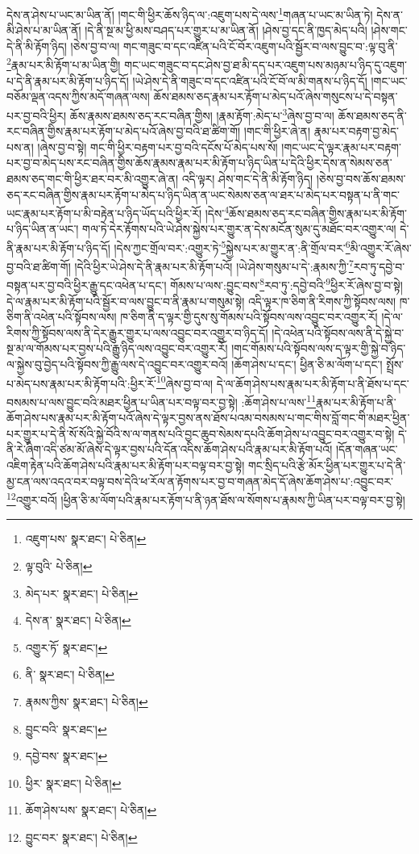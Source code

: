དེས་ན་ཤེས་པ་ཡང་མ་ཡིན་ནོ། །གང་གི་ཕྱིར་ཆོས་ཉིད་ལ་:འཇུག་པས་དེ་ལས་\footnote{འཇུག་པས་  སྣར་ཐང་།  པེ་ཅིན། }གཞན་པ་ཡང་མ་ཡིན་ཏེ། དེས་ན་མི་ཤེས་པ་མ་ཡིན་ནོ། །དེ་ནི་སྔ་མ་ཕྱི་མས་བཤད་པར་གྱུར་པ་མ་ཡིན་ནོ། །ཤེས་བྱ་དང་ནི་ཁྱད་མེད་པའི། །ཤེས་གང་དེ་ནི་མི་རྟོག་ཉིད། །ཅེས་བྱ་བ་ལ། གང་གཟུང་བ་དང་འཛིན་པའི་ངོ་བོར་འཇུག་པའི་སྦྱོར་བ་ལས་བྱུང་བ་:ལྟ་བུ་ནི་\footnote{ལྟ་བུའི་  པེ་ཅིན། }རྣམ་པར་མི་རྟོག་པ་མ་ཡིན་གྱི། གང་ཡང་གཟུང་བ་དང་ཤེས་བྱ་ཐ་མི་དད་པར་འཇུག་པས་མཉམ་པ་ཉིད་དུ་འཇུག་པ་དེ་ནི་རྣམ་པར་མི་རྟོག་པ་ཉིད་དོ། །ཡེ་ཤེས་དེ་ནི་གཟུང་བ་དང་འཛིན་པའི་ངོ་བོ་ལ་མི་གནས་པ་ཉིད་དོ། །གང་ཡང་བཅོམ་ལྡན་འདས་ཀྱིས་མདོ་གཞན་ལས། ཆོས་ཐམས་ཅད་རྣམ་པར་རྟོག་པ་མེད་པའོ་ཞེས་གསུངས་པ་དེ་བསྟན་པར་བྱ་བའི་ཕྱིར། ཆོས་རྣམས་ཐམས་ཅད་རང་བཞིན་གྱིས། །རྣམ་རྟོག་:མེད་པ་\footnote{མེད་པར་  སྣར་ཐང་།  པེ་ཅིན། }ཞེས་བྱ་བ་ལ། ཆོས་ཐམས་ཅད་ནི་རང་བཞིན་གྱིས་རྣམ་པར་རྟོག་པ་མེད་པའོ་ཞེས་བྱ་བའི་ཐ་ཚིག་གོ། །གང་གི་ཕྱིར་ཞེ་ན། རྣམ་པར་བརྟག་བྱ་མེད་པས་ན། །ཞེས་བྱ་བ་སྟེ། གང་གི་ཕྱིར་བརྟག་པར་བྱ་བའི་དངོས་པོ་མེད་པས་སོ། །གང་ཡང་དེ་ལྟར་རྣམ་པར་བརྟག་པར་བྱ་བ་མེད་པས་རང་བཞིན་གྱིས་ཆོས་རྣམས་རྣམ་པར་མི་རྟོག་པ་ཉིད་ཡིན་པ་དེའི་ཕྱིར་དེས་ན་སེམས་ཅན་ཐམས་ཅད་གང་གི་ཕྱིར་ཐར་བར་མི་འགྱུར་ཞེ་ན། འདི་ལྟར། ཤེས་གང་དེ་ནི་མི་རྟོག་ཉིད། །ཅེས་བྱ་བས་ཆོས་ཐམས་ཅད་རང་བཞིན་གྱིས་རྣམ་པར་རྟོག་པ་མེད་པ་ཉིད་ཡིན་ན་ཡང་སེམས་ཅན་ལ་ཐར་པ་མེད་པར་བསྟན་པ་ནི་གང་ཡང་རྣམ་པར་རྟོག་པ་མི་བརྟེན་པ་ཉིད་ཡོད་པའི་ཕྱིར་རོ། །དེས་\footnote{དེས་ན་  སྣར་ཐང་།  པེ་ཅིན། }ཆོས་ཐམས་ཅད་རང་བཞིན་གྱིས་རྣམ་པར་མི་རྟོག་པ་ཉིད་ཡིན་ན་ཡང་། གལ་ཏེ་དེར་རྟོགས་པའི་ཡེ་ཤེས་སྐྱེས་པར་གྱུར་ན་དེས་མངོན་སུམ་དུ་མཐོང་བར་འགྱུར་ལ། དེ་ནི་རྣམ་པར་མི་རྟོག་པ་ཉིད་དོ། །དེས་ཀྱང་གྲོལ་བར་:འགྱུར་ཏེ་\footnote{འགྱུར་ཏོ་  སྣར་ཐང་། }སྐྱེས་པར་མ་གྱུར་ན་:ནི་གྲོལ་བར་\footnote{ནི་  སྣར་ཐང་།  པེ་ཅིན། }མི་འགྱུར་རོ་ཞེས་བྱ་བའི་ཐ་ཚིག་གོ། །དེའི་ཕྱིར་ཡེ་ཤེས་དེ་ནི་རྣམ་པར་མི་རྟོག་པའོ། །ཡེ་ཤེས་གསུམ་པ་དེ་:རྣམས་ཀྱི་\footnote{རྣམས་ཀྱིས་  སྣར་ཐང་།  པེ་ཅིན། }རབ་ཏུ་དབྱེ་བ་བསྟན་པར་བྱ་བའི་ཕྱིར་རྒྱུ་དང་འཕེན་པ་དང་། གོམས་པ་ལས་:བྱུང་བས་\footnote{བྱུང་བའི་  སྣར་ཐང་། }རབ་ཏུ་:དབྱེ་བའི་\footnote{དབྱེ་བས་  སྣར་ཐང་། }ཕྱིར་རོ་ཞེས་བྱ་བ་སྟེ། དེ་ལ་རྣམ་པར་མི་རྟོག་པའི་སྦྱོར་བ་ལས་བྱུང་བ་ནི་རྣམ་པ་གསུམ་སྟེ། འདི་ལྟར་ཁ་ཅིག་ནི་རིགས་ཀྱི་སྟོབས་ལས། ཁ་ཅིག་ནི་འཕེན་པའི་སྟོབས་ལས། ཁ་ཅིག་ནི་ད་ལྟར་གྱི་དུས་སུ་གོམས་པའི་སྟོབས་ལས་འབྱུང་བར་འགྱུར་རོ། །དེ་ལ་རིགས་ཀྱི་སྟོབས་ལས་ནི་དེར་རྒྱུར་གྱུར་པ་ལས་འབྱུང་བར་འགྱུར་བ་ཉིད་དོ། །དེ་འཕེན་པའི་སྟོབས་ལས་ནི་དེ་སྐྱེ་བ་སྔ་མ་ལ་གོམས་པར་བྱས་པའི་རྒྱུ་ཉིད་ལས་འབྱུང་བར་འགྱུར་རོ། །གང་གོམས་པའི་སྟོབས་ལས་ད་ལྟར་གྱི་སྐྱེ་བ་ཉིད་ལ་སྐྱེས་བུ་བྱེད་པའི་སྟོབས་ཀྱི་རྒྱུ་ལས་དེ་འབྱུང་བར་འགྱུར་བའོ། །ཆོག་ཤེས་པ་དང་། ཕྱིན་ཅི་མ་ལོག་པ་དང་། སྤྲོས་པ་མེད་པས་རྣམ་པར་མི་རྟོག་པའི་:ཕྱིར་རོ་\footnote{ཕྱིར་  སྣར་ཐང་།  པེ་ཅིན། }ཞེས་བྱ་བ་ལ། དེ་ལ་ཆོག་ཤེས་པས་རྣམ་པར་མི་རྟོག་པ་ནི་ཐོས་པ་དང་བསམས་པ་ལས་བྱུང་བའི་མཐར་ཕྱིན་པ་ཡིན་པར་བལྟ་བར་བྱ་སྟེ། :ཆོག་ཤེས་པ་ལས་\footnote{ཆོག་ཤེས་པས་  སྣར་ཐང་།  པེ་ཅིན། }རྣམ་པར་མི་རྟོག་པ་ནི་ཆོག་ཤེས་པས་རྣམ་པར་མི་རྟོག་པའོ་ཞེས་དེ་ལྟར་བྱས་ནས་ཐོས་པའམ་བསམས་པ་གང་གིས་བློ་གང་གི་མཐར་ཕྱིན་པར་གྱུར་པ་དེ་ནི་སོ་སོའི་སྐྱེ་བོའི་ས་ལ་གནས་པའི་བྱང་ཆུབ་སེམས་དཔའི་ཆོག་ཤེས་པ་འབྱུང་བར་འགྱུར་བ་སྟེ། དེ་ནི་རེ་ཞིག་འདི་ཙམ་མོ་ཞེས་དེ་ལྟར་བྱས་པའི་དོན་འདིས་ཆོག་ཤེས་པའི་རྣམ་པར་མི་རྟོག་པའོ། །དོན་གཞན་ཡང་འཇིག་རྟེན་པའི་ཆོག་ཤེས་པའི་རྣམ་པར་མི་རྟོག་པར་བལྟ་བར་བྱ་སྟེ། གང་སྲིད་པའི་རྩེ་མོར་ཕྱིན་པར་གྱུར་པ་དེ་ནི་མྱ་ངན་ལས་འདའ་བར་བལྟ་བས་དེའི་ཕ་རོལ་ན་རྟོགས་པར་བྱ་བ་གཞན་མེད་དོ་ཞེས་ཆོག་ཤེས་པ་:འབྱུང་བར་\footnote{བྱུང་བར་  སྣར་ཐང་།  པེ་ཅིན། }འགྱུར་བའོ། །ཕྱིན་ཅི་མ་ལོག་པའི་རྣམ་པར་རྟོག་པ་ནི་ཉན་ཐོས་ལ་སོགས་པ་རྣམས་ཀྱི་ཡིན་པར་བལྟ་བར་བྱ་སྟེ། 